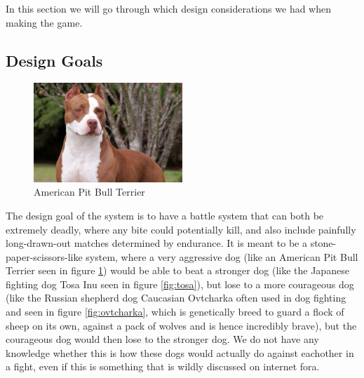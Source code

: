In this section we will go through which design considerations we had when making the game.\

\subsection{Design Goals}
\label{designGoals}

\begin{figure} 
	\centering
    \includegraphics[width=0.5\textwidth]{pitbull.jpg}
    \caption{American Pit Bull Terrier}
    \label{fig:pitbull}
\end{figure}

The design goal of the system is to have a battle system that can both be extremely deadly, where any bite could potentially kill, and also include painfully long-drawn-out matches determined by endurance. It is meant to be a stone-paper-scissors-like system, where a very aggressive dog (like an American Pit Bull Terrier seen in figure \ref{fig:pitbull}) would be able to beat a stronger dog (like the Japanese fighting dog Tosa Inu seen in figure \ref{fig:tosa}), but lose to a more courageous dog (like the Russian shepherd dog Caucasian Ovtcharka often used in dog fighting and seen in figure \ref{fig:ovtcharka}, which is genetically breed to guard a flock of sheep on its own, against a pack of wolves and is hence incredibly brave), but the courageous dog would then lose to the stronger dog. We do not have any knowledge whether this is how these dogs would actually do against eachother in a fight, even if this is something that is wildly discussed on internet fora.\

